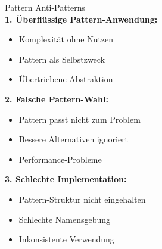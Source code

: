 \begin{KR}{Pattern Anti-Patterns}\\
\textbf{1. Überflüssige Pattern-Anwendung:}
\begin{itemize}
   \item Komplexität ohne Nutzen
   \item Pattern als Selbstzweck
   \item Übertriebene Abstraktion
\end{itemize}

\textbf{2. Falsche Pattern-Wahl:}
\begin{itemize}
   \item Pattern passt nicht zum Problem
   \item Bessere Alternativen ignoriert
   \item Performance-Probleme
\end{itemize}

\textbf{3. Schlechte Implementation:}
\begin{itemize}
   \item Pattern-Struktur nicht eingehalten
   \item Schlechte Namensgebung
   \item Inkonsistente Verwendung
\end{itemize}
\end{KR}

